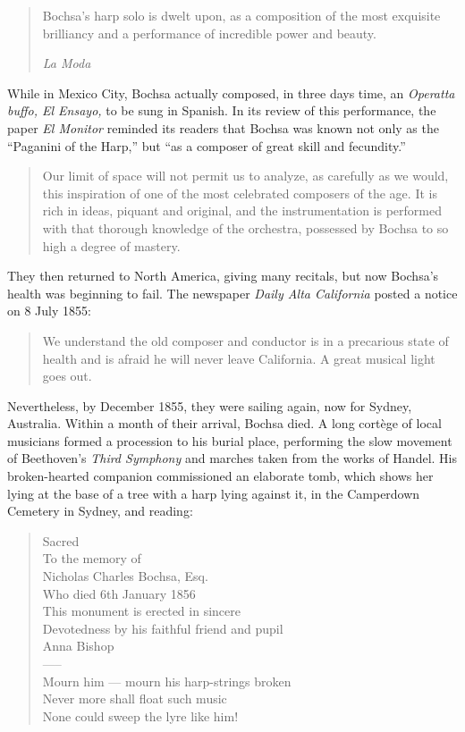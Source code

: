 \documentclass[a4paper, oneside, 12pt]{memoir}
\begin{document}
\begin{quotation}
  Bochsa's harp solo is dwelt upon, as a composition of the most exquisite brilliancy and a performance of incredible power and beauty.
  
\textit{La Moda}
\end{quotation}

While in Mexico City, Bochsa actually composed, in three days time, an \textit{Operatta buffo, El Ensayo,} to be sung in Spanish.  In its review of this performance, the paper \textit{El Monitor} reminded its readers that Bochsa was known not only as the ``Paganini of the Harp,'' but ``as a composer of great skill and fecundity.''
\begin{quotation}
  Our limit of space will not permit us to analyze, as carefully as we would, this inspiration of one of the most celebrated composers of the age. It is rich in ideas, piquant and original, and the instrumentation is performed with that thorough knowledge of the orchestra, possessed by Bochsa to so high a degree of mastery.
\end{quotation}



They then returned to North America, giving many recitals, but now Bochsa's health was beginning to fail. The newspaper \textit{Daily Alta California} posted a notice on 8 July 1855:
\begin{quotation}
  We understand the old composer and conductor is in a precarious state of health and is afraid he will never leave California. A great musical light goes out.
\end{quotation}


Nevertheless, by December 1855, they were sailing again, now for Sydney, Australia. Within a month of their arrival, Bochsa died. A long cort\`{e}ge of local musicians formed a procession to his burial place, performing the slow movement of Beethoven's \textit{Third Symphony} and marches taken from the works of Handel. His broken-hearted companion commissioned an elaborate tomb, which shows her lying at the base of a tree with a harp lying against it, in the Camperdown Cemetery in Sydney, and reading:

\begin{quotation}
\begin{center}
	Sacred\\
To the memory of\\
Nicholas Charles Bochsa, Esq.\\
Who died 6th January 1856\\
This monument is erected in sincere\\
Devotedness by his faithful friend and pupil\\
Anna Bishop\\
-----\\
Mourn him --- mourn his harp-strings broken\\
Never more shall float such music\\
None could sweep the lyre like him!
\end{center}
\end{quotation}
\end{document}
